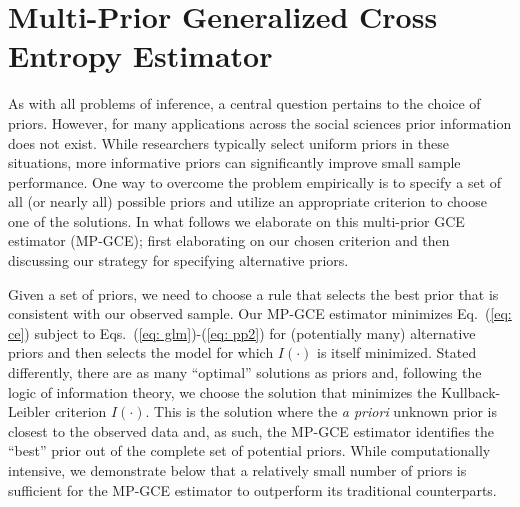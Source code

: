 \documentclass{elsarticle}
\begin{document}

\section{Multi-Prior Generalized Cross Entropy Estimator}
\label{sec: mp-gce}

As with all problems of inference, a central question pertains to the choice of 
priors. 
However, for many applications across the social sciences prior information 
does not exist. 
While researchers typically select uniform priors in these situations, more 
informative priors can significantly improve small sample performance.
One way to overcome the problem empirically is to specify a set of all (or 
nearly all) possible priors and utilize an appropriate criterion to choose one of 
the solutions.
In what follows we elaborate on this multi-prior GCE estimator (MP-GCE); first 
elaborating on our chosen criterion and then discussing our strategy for specifying 
alternative priors.

Given a set of priors, we need to choose a rule that selects the best prior that is 
consistent with our observed sample. 
Our MP-GCE estimator minimizes Eq.\ (\ref{eq: ce}) subject to 
Eqs.\ (\ref{eq: glm})-(\ref{eq: pp2}) for (potentially many) alternative priors and then 
selects the model for which $I(\cdot)$ is itself minimized. 
Stated differently, there are as many ``optimal'' solutions as priors and, following the logic 
of information theory, we choose the solution that minimizes the Kullback-Leibler criterion 
$I(\cdot)$. 
This is the solution where the \emph{a priori} unknown prior is closest to the observed 
data and, as such, the MP-GCE estimator identifies the ``best'' prior out of the complete 
set of potential priors. 
While computationally intensive, we demonstrate below that a relatively small 
number of priors is sufficient for the MP-GCE estimator to outperform its 
traditional counterparts.
\end{document}
